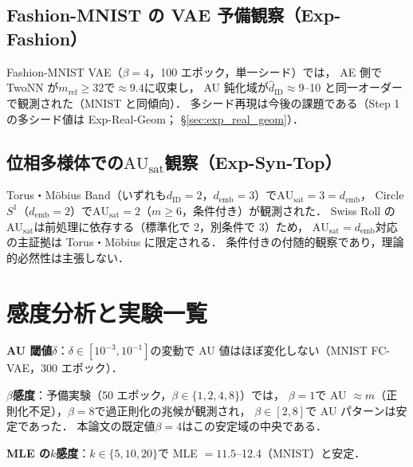 \documentclass[11pt,a4paper]{jsarticle}
\newcommand{\dID}{d_{\mathrm{ID}}}
\newcommand{\hatdID}{\hat{d}_{\mathrm{ID}}}
\newcommand{\AUsat}{\mathrm{AU}_{\mathrm{sat}}}
\newcommand{\demb}{d_{\mathrm{emb}}}
\begin{document}
\subsection{Fashion-MNIST の VAE 予備観察（Exp-Fashion）}

Fashion-MNIST VAE（$\beta = 4$，100 エポック，単一シード）では，
AE 側で TwoNN が$m_{\mathrm{ref}} \geq 32$で$\approx 9.4$に収束し，
AU 鈍化域が$\hatdID \approx 9$--10 と同一オーダーで観測された（MNIST と同傾向）．
多シード再現は今後の課題である（Step 1 の多シード値は Exp-Real-Geom；
§\ref{sec:exp_real_geom}）．

\subsection{位相多様体での$\AUsat$観察（Exp-Syn-Top）}

Torus・M\"obius Band（いずれも$\dID = 2$，$\demb = 3$）で$\AUsat = 3 = \demb$，
Circle $S^1$（$\demb = 2$）で$\AUsat = 2$（$m \geq 6$，条件付き）が観測された．
Swiss Roll の$\AUsat$は前処理に依存する（標準化で 2，別条件で 3）ため，
$\AUsat = \demb$対応の主証拠は Torus・M\"obius に限定される．
条件付きの付随的観察であり，理論的必然性は主張しない．

\section{感度分析と実験一覧}\label{app:sens}

\textbf{AU 閾値$\delta$}：$\delta \in [10^{-3}, 10^{-1}]$の変動で
AU 値はほぼ変化しない（MNIST FC-VAE，300 エポック）．

\textbf{$\beta$感度}：予備実験（50 エポック，$\beta \in \{1, 2, 4, 8\}$）では，
$\beta = 1$で AU $\approx m$（正則化不足），$\beta = 8$で過正則化の兆候が観測され，
$\beta \in [2, 8]$で AU パターンは安定であった．
本論文の既定値$\beta = 4$はこの安定域の中央である．

\textbf{MLE の$k$感度}：$k \in \{5, 10, 20\}$で MLE $= 11.5$--12.4（MNIST）と安定．
\end{document}
